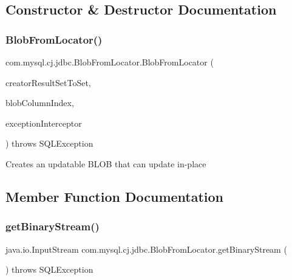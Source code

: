 \subsection{Constructor \& Destructor Documentation}
\mbox{\label{classcom_1_1mysql_1_1cj_1_1jdbc_1_1_blob_from_locator_a31ec6c3d1950b3a8a5270eac15b5a4fc}} 
\subsubsection{\texorpdfstring{Blob\+From\+Locator()}{BlobFromLocator()}}
{\footnotesize\ttfamily com.\+mysql.\+cj.\+jdbc.\+Blob\+From\+Locator.\+Blob\+From\+Locator (\begin{DoxyParamCaption}\item[{\mbox{\hyperlink{classcom_1_1mysql_1_1cj_1_1jdbc_1_1result_1_1_result_set_impl}{Result\+Set\+Impl}}}]{creator\+Result\+Set\+To\+Set,  }\item[{int}]{blob\+Column\+Index,  }\item[{\mbox{\hyperlink{interfacecom_1_1mysql_1_1cj_1_1exceptions_1_1_exception_interceptor}{Exception\+Interceptor}}}]{exception\+Interceptor }\end{DoxyParamCaption}) throws S\+Q\+L\+Exception}

Creates an updatable B\+L\+OB that can update in-\/place 

\subsection{Member Function Documentation}
\mbox{\label{classcom_1_1mysql_1_1cj_1_1jdbc_1_1_blob_from_locator_a4729992908a7cc12876aaaef51f7ce8e}} 
\subsubsection{\texorpdfstring{get\+Binary\+Stream()}{getBinaryStream()}}
{\footnotesize\ttfamily java.\+io.\+Input\+Stream com.\+mysql.\+cj.\+jdbc.\+Blob\+From\+Locator.\+get\+Binary\+Stream (\begin{DoxyParamCaption}{ }\end{DoxyParamCaption}) throws S\+Q\+L\+Exception}

